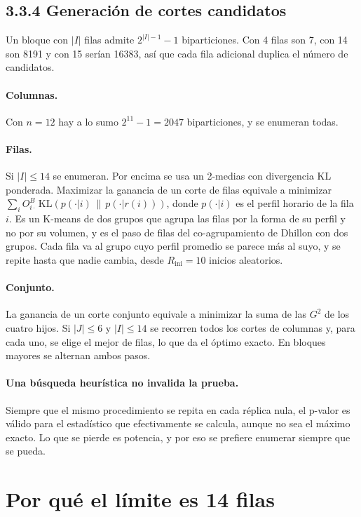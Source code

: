 \documentclass[11pt,a4paper]{article}
\begin{document}
\subsection{3.3.4 Generación de cortes candidatos}

Un bloque con $|I|$ filas admite $2^{|I|-1}-1$ biparticiones. Con 4 filas son 7,
con 14 son 8191 y con 15 serían 16383, así que cada fila adicional duplica el
número de candidatos.

\paragraph{Columnas.} Con $n=12$ hay a lo sumo $2^{11}-1=2047$ biparticiones, y se
enumeran todas.

\paragraph{Filas.} Si $|I|\le14$ se enumeran. Por encima se usa un 2-medias con
divergencia KL ponderada. Maximizar la ganancia de un corte de filas equivale a
minimizar $\sum_iO^B_{i\cdot}\,\mathrm{KL}(p(\cdot|i)\,\|\,p(\cdot|r(i)))$, donde
$p(\cdot|i)$ es el perfil horario de la fila $i$. Es un K-means de dos grupos que
agrupa las filas por la forma de su perfil y no por su volumen, y es el paso de filas
del co-agrupamiento de Dhillon con dos grupos. Cada fila va al grupo cuyo perfil
promedio se parece más al suyo, y se repite hasta que nadie cambia, desde
$R_{\mathrm{ini}}=10$ inicios aleatorios.

\paragraph{Conjunto.} La ganancia de un corte conjunto equivale a minimizar la suma
de las $G^2$ de los cuatro hijos. Si $|J|\le6$ y $|I|\le14$ se recorren todos los
cortes de columnas y, para cada uno, se elige el mejor de filas, lo que da el óptimo
exacto. En bloques mayores se alternan ambos pasos.

\paragraph{Una búsqueda heurística no invalida la prueba.} Siempre que el mismo
procedimiento se repita en cada réplica nula, el p-valor es válido para el estadístico
que efectivamente se calcula, aunque no sea el máximo exacto. Lo que se pierde es
potencia, y por eso se prefiere enumerar siempre que se pueda.

\section{Por qué el límite es 14 filas}
\end{document}
